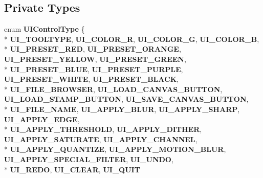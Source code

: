 \subsection*{Private Types}
\begin{DoxyCompactItemize}
\item 
enum {\bfseries U\-I\-Control\-Type} \{ \\*
{\bfseries U\-I\-\_\-\-T\-O\-O\-L\-T\-Y\-P\-E}, 
{\bfseries U\-I\-\_\-\-C\-O\-L\-O\-R\-\_\-\-R}, 
{\bfseries U\-I\-\_\-\-C\-O\-L\-O\-R\-\_\-\-G}, 
{\bfseries U\-I\-\_\-\-C\-O\-L\-O\-R\-\_\-\-B}, 
\\*
{\bfseries U\-I\-\_\-\-P\-R\-E\-S\-E\-T\-\_\-\-R\-E\-D}, 
{\bfseries U\-I\-\_\-\-P\-R\-E\-S\-E\-T\-\_\-\-O\-R\-A\-N\-G\-E}, 
{\bfseries U\-I\-\_\-\-P\-R\-E\-S\-E\-T\-\_\-\-Y\-E\-L\-L\-O\-W}, 
{\bfseries U\-I\-\_\-\-P\-R\-E\-S\-E\-T\-\_\-\-G\-R\-E\-E\-N}, 
\\*
{\bfseries U\-I\-\_\-\-P\-R\-E\-S\-E\-T\-\_\-\-B\-L\-U\-E}, 
{\bfseries U\-I\-\_\-\-P\-R\-E\-S\-E\-T\-\_\-\-P\-U\-R\-P\-L\-E}, 
{\bfseries U\-I\-\_\-\-P\-R\-E\-S\-E\-T\-\_\-\-W\-H\-I\-T\-E}, 
{\bfseries U\-I\-\_\-\-P\-R\-E\-S\-E\-T\-\_\-\-B\-L\-A\-C\-K}, 
\\*
{\bfseries U\-I\-\_\-\-F\-I\-L\-E\-\_\-\-B\-R\-O\-W\-S\-E\-R}, 
{\bfseries U\-I\-\_\-\-L\-O\-A\-D\-\_\-\-C\-A\-N\-V\-A\-S\-\_\-\-B\-U\-T\-T\-O\-N}, 
{\bfseries U\-I\-\_\-\-L\-O\-A\-D\-\_\-\-S\-T\-A\-M\-P\-\_\-\-B\-U\-T\-T\-O\-N}, 
{\bfseries U\-I\-\_\-\-S\-A\-V\-E\-\_\-\-C\-A\-N\-V\-A\-S\-\_\-\-B\-U\-T\-T\-O\-N}, 
\\*
{\bfseries U\-I\-\_\-\-F\-I\-L\-E\-\_\-\-N\-A\-M\-E}, 
{\bfseries U\-I\-\_\-\-A\-P\-P\-L\-Y\-\_\-\-B\-L\-U\-R}, 
{\bfseries U\-I\-\_\-\-A\-P\-P\-L\-Y\-\_\-\-S\-H\-A\-R\-P}, 
{\bfseries U\-I\-\_\-\-A\-P\-P\-L\-Y\-\_\-\-E\-D\-G\-E}, 
\\*
{\bfseries U\-I\-\_\-\-A\-P\-P\-L\-Y\-\_\-\-T\-H\-R\-E\-S\-H\-O\-L\-D}, 
{\bfseries U\-I\-\_\-\-A\-P\-P\-L\-Y\-\_\-\-D\-I\-T\-H\-E\-R}, 
{\bfseries U\-I\-\_\-\-A\-P\-P\-L\-Y\-\_\-\-S\-A\-T\-U\-R\-A\-T\-E}, 
{\bfseries U\-I\-\_\-\-A\-P\-P\-L\-Y\-\_\-\-C\-H\-A\-N\-N\-E\-L}, 
\\*
{\bfseries U\-I\-\_\-\-A\-P\-P\-L\-Y\-\_\-\-Q\-U\-A\-N\-T\-I\-Z\-E}, 
{\bfseries U\-I\-\_\-\-A\-P\-P\-L\-Y\-\_\-\-M\-O\-T\-I\-O\-N\-\_\-\-B\-L\-U\-R}, 
{\bfseries U\-I\-\_\-\-A\-P\-P\-L\-Y\-\_\-\-S\-P\-E\-C\-I\-A\-L\-\_\-\-F\-I\-L\-T\-E\-R}, 
{\bfseries U\-I\-\_\-\-U\-N\-D\-O}, 
\\*
{\bfseries U\-I\-\_\-\-R\-E\-D\-O}, 
{\bfseries U\-I\-\_\-\-C\-L\-E\-A\-R}, 
{\bfseries U\-I\-\_\-\-Q\-U\-I\-T}

\end{DoxyCompactItemize}
